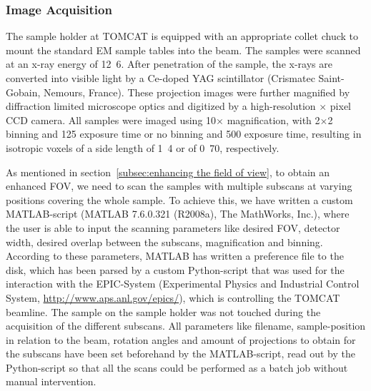 \subsubsection{Image Acquisition}
The sample holder at TOMCAT is equipped with an appropriate collet chuck to mount the standard EM sample tables into the beam. The samples were scanned at an x-ray energy of \unit{12.6}{\kilo\electronvolt}. After penetration of the sample, the x-rays are converted into visible light by a Ce-doped YAG scintillator (Crismatec Saint-Gobain, Nemours, France). These projection images were further magnified by diffraction limited microscope optics and digitized by a high-resolution $\times$ pixel CCD camera. All samples were imaged using 10$\times$ magnification, with 2$\times$2 binning and \unit{125}{\milli\second} exposure time or no binning and \unit{500}{\milli\second} exposure time, resulting in isotropic voxels of a side length of \unit{1.4}{\micro\meter} or of \unit{0.70}{\micro\meter}, respectively.

As mentioned in section~\ref{subsec:enhancing the field of view}, to obtain an enhanced FOV, we need to scan the samples with multiple subscans at varying positions covering the whole sample. To achieve this, we have written a custom MATLAB\textregistered-script (MATLAB 7.6.0.321 (R2008a), The MathWorks, Inc.), where the user is able to input the scanning parameters like desired FOV, detector width, desired overlap between the subscans, magnification and binning. According to these parameters, MATLAB has written a preference file to the disk, which has been parsed by a custom Python-script that was used for the interaction with the EPIC-System (Experimental Physics and Industrial Control System, \url{http://www.aps.anl.gov/epics/}), which is controlling the TOMCAT beamline. The sample on the sample holder was not touched during the acquisition of the different subscans. All parameters like filename, sample-position in relation to the beam, rotation angles and amount of projections to obtain for the subscans have been set beforehand by the MATLAB-script, read out by the Python-script so that all the scans could be performed as a batch job without manual intervention.

